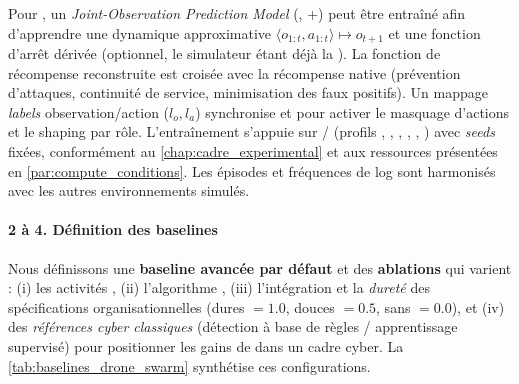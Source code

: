 Pour , un \textit{Joint-Observation Prediction Model} (, +) peut être entraîné afin d'apprendre une dynamique approximative $\langle o_{1:t}, a_{1:t} \rangle \mapsto o_{t+1}$ et une fonction d'arrêt dérivée (optionnel, le simulateur étant déjà la ). La fonction de récompense reconstruite est croisée avec la récompense native (prévention d'attaques, continuité de service, minimisation des faux positifs). Un mappage \emph{labels} observation/action ($l_o, l_a$) synchronise  et  pour activer le masquage d'actions et le shaping par rôle. L'entraînement s'appuie sur / (profils , , , , , ) avec \textit{seeds} fixées, conformément au \autoref{chap:cadre_experimental} et aux ressources présentées en \autoref{par:compute_conditions}. Les épisodes et fréquences de log sont harmonisés avec les autres environnements simulés.

\paragraph{2 à 4. Définition des baselines}

Nous définissons une \textbf{baseline avancée par défaut} et des \textbf{ablations} qui varient : (i) les activités , (ii) l'algorithme , (iii) l'intégration et la \textit{dureté} des spécifications organisationnelles (dures $=1.0$, douces $=0.5$, sans $=0.0$), et (iv) des \textit{références cyber classiques} (détection à base de règles / apprentissage supervisé) pour positionner les gains de  dans un cadre cyber. La \autoref{tab:baselines_drone_swarm} synthétise ces configurations.



